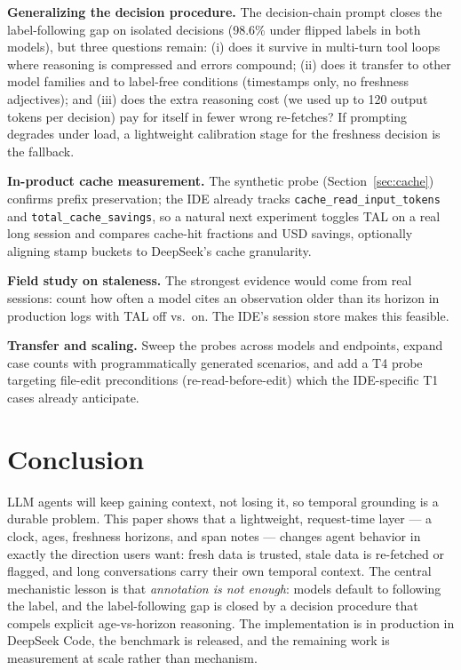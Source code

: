 \documentclass[10pt]{article}
\begin{document}
\textbf{Generalizing the decision procedure.} The decision-chain prompt closes the
label-following gap on isolated decisions (98.6\% under flipped labels in both
models), but three questions remain: (i) does it survive in multi-turn tool loops
where reasoning is compressed and errors compound; (ii) does it transfer to other
model families and to label-free conditions (timestamps only, no freshness
adjectives); and (iii) does the extra reasoning cost (we used up to 120 output
tokens per decision) pay for itself in fewer wrong re-fetches? If prompting
degrades under load, a lightweight calibration stage for the freshness decision is
the fallback.

\textbf{In-product cache measurement.} The synthetic probe (Section~\ref{sec:cache})
confirms prefix preservation; the IDE already tracks
\texttt{cache\_read\_input\_tokens} and \texttt{total\_cache\_savings}, so a natural
next experiment toggles TAL on a real long session and compares cache-hit fractions
and USD savings, optionally aligning stamp buckets to DeepSeek's cache granularity.

\textbf{Field study on staleness.} The strongest evidence would come from real
sessions: count how often a model cites an observation older than its horizon in
production logs with TAL off vs.\ on. The IDE's session store makes this feasible.

\textbf{Transfer and scaling.} Sweep the probes across models and endpoints, expand
case counts with programmatically generated scenarios, and add a T4 probe targeting
file-edit preconditions (re-read-before-edit) which the IDE-specific T1 cases already
anticipate.

\section{Conclusion}
\label{sec:conclusion}

LLM agents will keep gaining context, not losing it, so temporal grounding is a
durable problem. This paper shows that a lightweight, request-time layer --- a clock,
ages, freshness horizons, and span notes --- changes agent behavior in exactly the
direction users want: fresh data is trusted, stale data is re-fetched or flagged, and
long conversations carry their own temporal context. The central mechanistic lesson
is that \emph{annotation is not enough}: models default to following the label, and
the label-following gap is closed by a decision procedure that compels explicit
age-vs-horizon reasoning. The implementation is in
production in DeepSeek Code, the benchmark is released, and the remaining work is
measurement at scale rather than mechanism.
\end{document}
